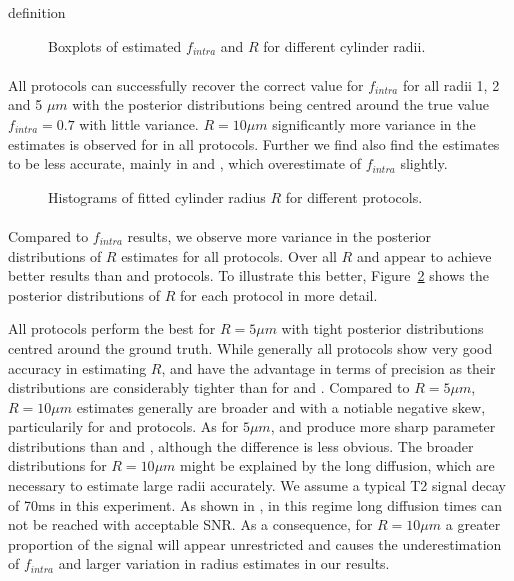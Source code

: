 definition
\begin{figure}[H]
	\centering
	
	
	\caption{Boxplots of estimated $f_{intra}$ and $R$ for different cylinder radii.}
	\label{fig:chapter7 exp1 boxplots 60mT}
\end{figure}


\paragraph{} All protocols can successfully recover the correct value for $f_{intra}$ for all radii 1, 2 and 5 $\mu m$ with the posterior distributions being centred around the true value $f_{intra}=0.7$ with little variance. $R=10\mu m$ significantly more variance in the estimates is observed for in all protocols. Further we find also find the estimates to be less accurate, mainly in {\SF} and {\SD}, which overestimate of $f_{intra}$ slightly.

\begin{figure}[H]
	 \centering
	 
	 \caption{Histograms of fitted cylinder radius $R$ for different protocols.}
	 \label{fig:chapter7 exp1 histograms 60mT}
\end{figure}

\paragraph{} Compared to $f_{intra}$ results, we observe more variance in the posterior distributions of $R$ estimates for all protocols. Over all $R$ {\DO} and {\FD} appear to achieve better results than {\OI} and {\SD} protocols. To illustrate this better, Figure~\ref{fig:chapter7 exp1 histograms 60mT} shows the posterior distributions of $R$ for each protocol in more detail.

All protocols perform the best for $R=5\mu m$ with tight posterior distributions centred around the ground truth. While generally all protocols show very good accuracy in estimating $R$, {\DO} and {\FD} have the advantage in terms of precision as their distributions are considerably tighter than for {\OI} and {\SD}. Compared to $R=5\mu m$, $R=10\mu m$ estimates generally are broader and with a notiable  negative skew, particularily for {\OI} and {\SD} protocols.  As for $5\mu m$, {\DO} and {\FD} produce more sharp parameter distributions than {\OI} and {\SD}, although the difference is less obvious. The broader distributions for $R=10\mu m$ might be explained by the long diffusion, which are necessary to estimate large radii accurately.  We assume a typical T2 signal decay of 70ms in this experiment. As shown in \citep{Alexander:STEAM}, in this regime long diffusion times can not be reached with acceptable SNR. As a consequence, for $R=10\mu m$ a greater proportion of the signal will appear unrestricted and causes the underestimation of $f_{intra}$ and larger variation in radius estimates in our results.

